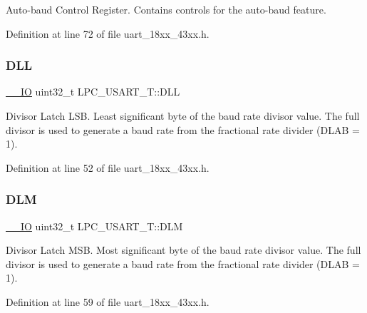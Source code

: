 Auto-\/baud Control Register. Contains controls for the auto-\/baud feature. 

Definition at line 72 of file uart\+\_\+18xx\+\_\+43xx.\+h.

\mbox{\label{struct_l_p_c___u_s_a_r_t___t_ac2e91646e820b1527747154d82778e48}} 
\subsubsection{\texorpdfstring{D\+LL}{DLL}}
{\footnotesize\ttfamily \hyperlink{core__sc300_8h_aec43007d9998a0a0e01faede4133d6be}{\+\_\+\+\_\+\+IO} uint32\+\_\+t L\+P\+C\+\_\+\+U\+S\+A\+R\+T\+\_\+\+T\+::\+D\+LL}

Divisor Latch L\+SB. Least significant byte of the baud rate divisor value. The full divisor is used to generate a baud rate from the fractional rate divider (D\+L\+AB = 1). 

Definition at line 52 of file uart\+\_\+18xx\+\_\+43xx.\+h.

\mbox{\label{struct_l_p_c___u_s_a_r_t___t_a3e9b4b467fbbf43e57e261fd826e5e97}} 
\subsubsection{\texorpdfstring{D\+LM}{DLM}}
{\footnotesize\ttfamily \hyperlink{core__sc300_8h_aec43007d9998a0a0e01faede4133d6be}{\+\_\+\+\_\+\+IO} uint32\+\_\+t L\+P\+C\+\_\+\+U\+S\+A\+R\+T\+\_\+\+T\+::\+D\+LM}

Divisor Latch M\+SB. Most significant byte of the baud rate divisor value. The full divisor is used to generate a baud rate from the fractional rate divider (D\+L\+AB = 1). 

Definition at line 59 of file uart\+\_\+18xx\+\_\+43xx.\+h.

\mbox{\label{struct_l_p_c___u_s_a_r_t___t_a01d439a681b9a7a486ad75c91a2f91c8}} 
